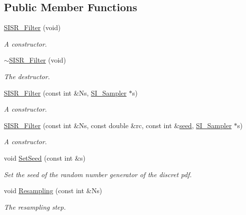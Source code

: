 \subsection*{Public Member Functions}
\begin{CompactItemize}
\item 
\hyperlink{class_s_i_s_r___filter_ea2d9da796f3b59061d3c20b8d260794}{SISR\_\-Filter} (void)
\begin{CompactList}\small\item\em A constructor. \item\end{CompactList}\item 
\hyperlink{class_s_i_s_r___filter_9b76e88c5ce33eb3f3835084feaffb8c}{$\sim$SISR\_\-Filter} (void)
\begin{CompactList}\small\item\em The destructor. \item\end{CompactList}\item 
\hyperlink{class_s_i_s_r___filter_ee8aaf7607b94e836bf5a8227b741e83}{SISR\_\-Filter} (const int \&Ns, \hyperlink{class_s_i___sampler}{SI\_\-Sampler} $\ast$s)
\begin{CompactList}\small\item\em A constructor. \item\end{CompactList}\item 
\hyperlink{class_s_i_s_r___filter_ac330d4b6001a394af4beb4ee46b1909}{SISR\_\-Filter} (const int \&Ns, const double \&rc, const int \&\hyperlink{class_s_i_s_r___filter_aefe1be49175842bd0bd115e0f2dd647}{seed}, \hyperlink{class_s_i___sampler}{SI\_\-Sampler} $\ast$s)
\begin{CompactList}\small\item\em A constructor. \item\end{CompactList}\item 
void \hyperlink{class_s_i_s_r___filter_5044fef30828c3303ad1dbc83cadcc06}{SetSeed} (const int \&s)
\begin{CompactList}\small\item\em Set the seed of the random number generator of the discret pdf. \item\end{CompactList}\item 
void \hyperlink{class_s_i_s_r___filter_615f0daa6560454c0d2190020a5bb06c}{Resampling} (const int \&Ns)
\begin{CompactList}\small\item\em The resampling step. \item\end{CompactList}\item 

\end{CompactItemize}
